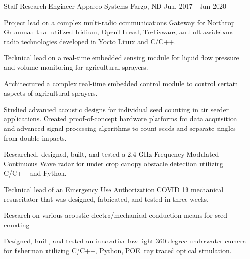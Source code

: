 \begin{cventries}
  \cventry
    {Staff Research Engineer} %
    {Appareo Systems} %
    {Fargo, ND} %
    {Jun. 2017 - Jun 2020} %
    {
      \begin{cvitems} %
        \item {Project lead on a complex multi-radio communications Gateway for Northrop Grumman that utilized Iridium, OpenThread, Trellisware, and ultrawideband radio technologies developed in Yocto Linux and C/C++.}
        \item {Technical lead on a real-time embedded sensing module for liquid flow pressure and volume monitoring for agricultural sprayers.}
        \item {Architectured a complex real-time embedded control module to control certain aspects of agricultural sprayers.}
        \item {Studied advanced acoustic designs for individual seed counting in air seeder applications. Created proof-of-concept hardware platforms for data acquisition and advanced signal processing algorithms to count seeds and separate singles from double impacts.}
        \item {Researched, designed, built, and tested a 2.4 GHz Frequency Modulated Continuous Wave radar for under crop canopy obstacle detection utilizing C/C++ and Python.}
        \item {Technical lead of an Emergency Use Authorization COVID 19 mechanical resuscitator that was designed, fabricated, and tested in three weeks.}
        \item {Research on various acoustic electro/mechanical conduction means for seed counting.}
        \item {Designed, built, and tested an innovative low light 360 degree underwater camera for fisherman utilizing C/C++, Python, POE, ray traced optical simulation.}
      \end{cvitems}
    }


\end{cventries}
